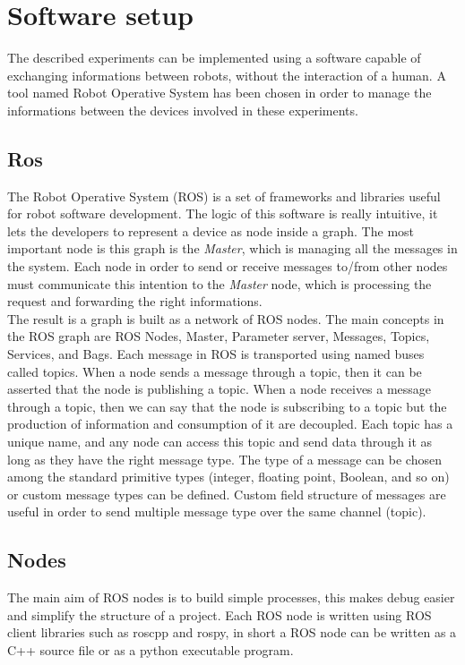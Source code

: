 \chapter{Software setup}
The described experiments can be implemented using a software capable of exchanging informations between robots, without the interaction of a human. A tool named Robot Operative System has been chosen in order to manage the informations between the devices involved in these experiments.  
\section{Ros}
The Robot Operative System (ROS) is a set of frameworks and libraries useful for robot software development. The logic of this software is really intuitive, it lets the developers to represent a device as node inside a graph. The most important node is this graph is the \textit{Master}, which is managing all the messages in the system. Each node in order to send or receive messages to/from other nodes must communicate this intention to the \textit{Master} node, which is processing the request and forwarding the right informations.\\
The result is a graph is built as a network of ROS nodes.
The main concepts in the ROS graph are ROS Nodes, Master, Parameter server, Messages,
Topics, Services, and Bags. 
Each message in ROS is transported using named buses called topics. When a node sends a message through a topic, then it can be asserted that the node is publishing a topic. When a node receives a message through a topic,
then we can say that the node is subscribing to a topic but the production of information and consumption of it are decoupled. Each topic has a unique name, and any node can access this topic and send data through it as long as they have the right message type. The type of a message can be chosen among the standard primitive types (integer, floating point, Boolean, and so on) or custom message types can be defined. Custom field structure of messages are useful in order to send multiple message type over the same channel (topic).

\section{Nodes}
The main aim of ROS nodes is to build simple processes, this makes debug easier and simplify the structure of a project. Each ROS node is written using ROS client libraries such as roscpp and rospy, in short a ROS node can be written as a C++ source file or as a python executable program. 

